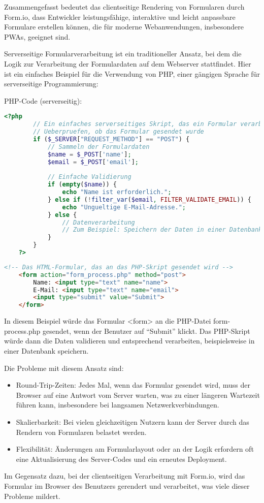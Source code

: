 Zusammengefasst bedeutet das clientseitige Rendering von Formularen durch Form.io, dass Entwickler leistungsfähige, interaktive und leicht anpassbare Formulare erstellen können, die für moderne Webanwendungen, insbesondere PWAs, geeignet sind.

Serverseitige Formularverarbeitung ist ein traditioneller Ansatz, bei dem die Logik zur Verarbeitung der Formulardaten auf dem Webserver stattfindet. Hier ist ein einfaches Beispiel für die Verwendung von PHP, einer gängigen Sprache für serverseitige Programmierung:

PHP-Code (serverseitig):
\begin{lstlisting}[language=PHP]
    <?php
        // Ein einfaches serverseitiges Skript, das ein Formular verarbeitet
        // Ueberpruefen, ob das Formular gesendet wurde
        if ($_SERVER["REQUEST_METHOD"] == "POST") {
            // Sammeln der Formulardaten
            $name = $_POST['name'];
            $email = $_POST['email'];
        
            // Einfache Validierung
            if (empty($name)) {
                echo "Name ist erforderlich.";
            } else if (!filter_var($email, FILTER_VALIDATE_EMAIL)) {
                echo "Ungueltige E-Mail-Adresse.";
            } else {
                // Datenverarbeitung
                // Zum Beispiel: Speichern der Daten in einer Datenbank
            }
        }
    ?>
\end{lstlisting}
\begin{lstlisting}[language=HTML]
    <!-- Das HTML-Formular, das an das PHP-Skript gesendet wird -->
    <form action="form_process.php" method="post">
        Name: <input type="text" name="name">
        E-Mail: <input type="text" name="email">
        <input type="submit" value="Submit">
    </form>
\end{lstlisting}

In diesem Beispiel würde das Formular <form> an die PHP-Datei form-process.php gesendet, wenn der Benutzer auf ``Submit'' klickt. Das PHP-Skript würde dann die Daten validieren und entsprechend verarbeiten, beispielsweise in einer Datenbank speichern.

Die Probleme mit diesem Ansatz sind:
\begin{itemize}
    \item Round-Trip-Zeiten: Jedes Mal, wenn das Formular gesendet wird, muss der Browser auf eine Antwort vom Server warten, was zu einer längeren Wartezeit führen kann, insbesondere bei langsamen Netzwerkverbindungen.
    \item Skalierbarkeit: Bei vielen gleichzeitigen Nutzern kann der Server durch das Rendern von Formularen belastet werden.
    \item Flexibilität: Änderungen am Formularlayout oder an der Logik erfordern oft eine Aktualisierung des Server-Codes und ein erneutes Deployment.
\end{itemize}

Im Gegensatz dazu, bei der clientseitigen Verarbeitung mit Form.io, wird das Formular im Browser des Benutzers gerendert und verarbeitet, was viele dieser Probleme mildert.